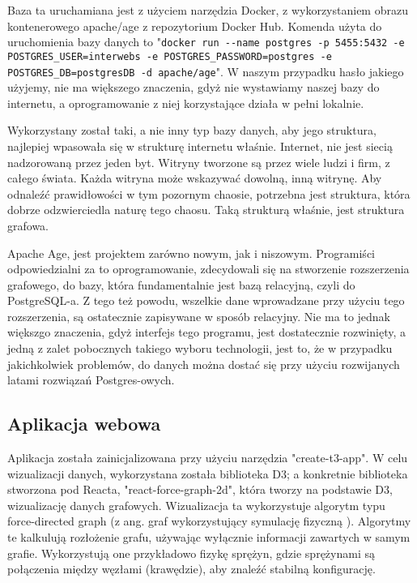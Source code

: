 \documentclass[a4paper, 12pt]{article}
\begin{document}
Baza ta uruchamiana jest z użyciem narzędzia Docker, z wykorzystaniem obrazu kontenerowego apache/age z repozytorium Docker Hub. Komenda użyta do uruchomienia bazy danych to "\lstinline{docker run --name postgres -p 5455:5432 -e POSTGRES_USER=interwebs -e POSTGRES_PASSWORD=postgres -e POSTGRES_DB=postgresDB -d apache/age}". W naszym przypadku hasło jakiego użyjemy, nie ma większego znaczenia, gdyż nie wystawiamy naszej bazy do internetu, a oprogramowanie z niej korzystające działa w pełni lokalnie.

Wykorzystany został taki, a nie inny typ bazy danych, aby jego struktura, najlepiej wpasowała się w strukturę internetu właśnie. Internet, nie jest siecią nadzorowaną przez jeden byt. Witryny tworzone są przez wiele ludzi i firm, z całego świata. Każda witryna może wskazywać dowolną, inną witrynę. Aby odnaleźć prawidłowości w tym pozornym chaosie, potrzebna jest struktura, która dobrze odzwierciedla naturę tego chaosu. Taką strukturą właśnie, jest struktura grafowa.

Apache Age, jest projektem zarówno nowym, jak i niszowym. Programiści odpowiedzialni za to oprogramowanie, zdecydowali się na stworzenie rozszerzenia grafowego, do bazy, która fundamentalnie jest bazą relacyjną, czyli do PostgreSQL-a. Z tego też powodu, wszelkie dane wprowadzane przy użyciu tego rozszerzenia, są ostatecznie zapisywane w sposób relacyjny. Nie ma to jednak większgo znaczenia, gdyż interfejs tego programu, jest dostatecznie rozwinięty, a jedną z zalet pobocznych takiego wyboru technologii, jest to, że w przypadku jakichkolwiek problemów, do danych można dostać się przy użyciu rozwijanych latami rozwiązań Postgres-owych.

\subsection{Aplikacja webowa}
Aplikacja została zainicjalizowana przy użyciu narzędzia "create-t3-app". W celu wizualizacji danych, wykorzystana została biblioteka D3; a konkretnie biblioteka stworzona pod Reacta, "react-force-graph-2d", która tworzy na podstawie D3, wizualizację danych grafowych.\cite{reactForceGraph} Wizualizacja ta wykorzystuje algorytm typu force-directed graph (z ang. graf wykorzystujący symulację fizyczną \cite{zaryjewskiForceDirectedGraph}). Algorytmy te kalkulują rozłożenie grafu, używając wyłącznie informacji zawartych w samym grafie. Wykorzystują one przykładowo fizykę sprężyn, gdzie sprężynami są połączenia między węzłami (krawędzie), aby znaleźć stabilną konfigurację.\cite{kobourovSpringEmbeddersForce}
\end{document}
